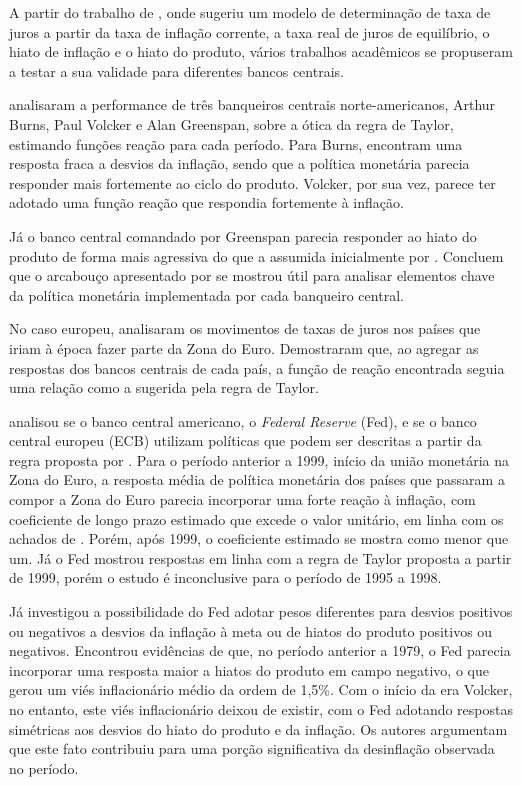 \documentclass[
	article,			%
	11pt,				%
	oneside,			%
	a4paper,			%
	english,			%
	brazil,				%
	]{abntex2}
\begin{document}
	A partir do trabalho de , onde sugeriu um modelo de determinação de taxa de juros a partir da taxa de inflação corrente, a taxa real de juros de equilíbrio, o hiato de inflação e o hiato do produto, vários trabalhos acadêmicos se propuseram a testar a sua validade para diferentes bancos centrais.
	
	 analisaram a performance de três banqueiros centrais norte-americanos, Arthur Burns, Paul Volcker e Alan Greenspan, sobre a ótica da regra de Taylor, estimando funções reação para cada período. Para Burns, encontram uma resposta fraca a desvios da inflação, sendo que a política monetária parecia responder mais fortemente ao ciclo do produto. Volcker, por sua vez, parece ter adotado uma função reação que respondia fortemente à inflação. 
	
	Já o banco central comandado por Greenspan parecia responder ao hiato do produto de forma mais agressiva do que a assumida inicialmente por . Concluem que o arcabouço apresentado por  se mostrou útil para analisar elementos chave da política monetária implementada por cada banqueiro central.
	
	No caso europeu,  analisaram os movimentos de taxas de juros nos países que iriam à época fazer parte da Zona do Euro. Demostraram que, ao agregar as respostas dos bancos centrais de cada país, a função de reação encontrada seguia uma relação como a sugerida pela regra de Taylor.
	
	 analisou se o banco central americano, o \textit{Federal Reserve} (Fed), e se o banco central europeu (ECB) utilizam políticas que podem ser descritas a partir da regra proposta por . Para o período anterior a 1999, início da união monetária na Zona do Euro, a resposta média de política monetária dos países que passaram a compor a Zona do Euro parecia incorporar uma forte reação à inflação, com coeficiente de longo prazo estimado que excede o valor unitário, em linha com os achados de . Porém, após 1999, o coeficiente estimado se mostra como menor que um. Já o Fed mostrou respostas em linha com a regra de Taylor proposta a partir de 1999, porém o estudo é inconclusive para o período de 1995 a 1998.
	
	Já  investigou a possibilidade do Fed adotar pesos diferentes para desvios positivos ou negativos a desvios da inflação à meta ou de hiatos do produto positivos ou negativos. Encontrou evidências de que, no período anterior a 1979, o Fed parecia incorporar uma resposta maior a hiatos do produto em campo negativo, o que gerou um viés inflacionário médio da ordem de 1,5\%. Com o início da era Volcker, no entanto, este viés inflacionário deixou de existir, com o Fed adotando respostas simétricas aos desvios do hiato do produto e da inflação. Os autores argumentam que este fato contribuiu para uma porção significativa da desinflação observada no período.
	
\end{document}
